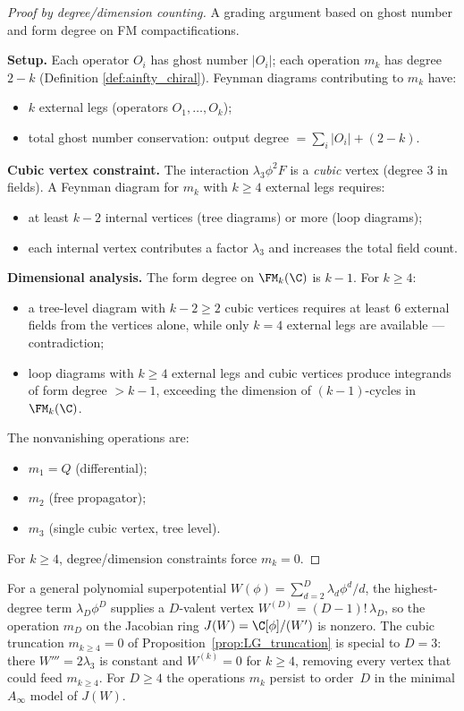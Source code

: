 \begin{proof}[Proof by degree/dimension counting]
A grading argument based on ghost number and form degree on FM compactifications.

\textbf{Setup.} Each operator $O_i$ has ghost number $|O_i|$; each operation $m_k$ has degree $2-k$ (Definition \ref{def:ainfty_chiral}). Feynman diagrams contributing to $m_k$ have:
\begin{itemize}
\item $k$ external legs (operators $O_1,\ldots,O_k$);
\item total ghost number conservation: output degree $= \sum_i |O_i| + (2-k)$.
\end{itemize}

\textbf{Cubic vertex constraint.} The interaction $\lambda_3 \phi^2 F$ is a \emph{cubic} vertex (degree 3 in fields). A Feynman diagram for $m_k$ with $k \geq 4$ external legs requires:
\begin{itemize}
\item at least $k-2$ internal vertices (tree diagrams) or more (loop diagrams);
\item each internal vertex contributes a factor $\lambda_3$ and increases the total field count.
\end{itemize}

\textbf{Dimensional analysis.} The form degree on $\FM_k(\C)$ is $k-1$. For $k \geq 4$:
\begin{itemize}
\item a tree-level diagram with $k-2 \geq 2$ cubic vertices requires at least 6 external fields from the vertices alone, while only $k = 4$ external legs are available — contradiction;
\item loop diagrams with $k \geq 4$ external legs and cubic vertices produce integrands of form degree $> k-1$, exceeding the dimension of $(k-1)$-cycles in $\FM_k(\C)$.
\end{itemize}

The nonvanishing operations are:
\begin{itemize}
\item $m_1 = Q$ (differential);
\item $m_2$ (free propagator);
\item $m_3$ (single cubic vertex, tree level).
\end{itemize}
For $k \geq 4$, degree/dimension constraints force $m_k = 0$.
\end{proof}

\begin{remark}
For a general polynomial superpotential $W(\phi) = \sum_{d=2}^D \lambda_d \phi^d/d$, the highest-degree term $\lambda_D\phi^D$ supplies a $D$-valent vertex $W^{(D)} = (D-1)!\,\lambda_D$, so the operation $m_D$ on the Jacobian ring $J(W) = \C[\phi]/(W')$ is nonzero. The cubic truncation $m_{k\ge 4} = 0$ of Proposition~\ref{prop:LG_truncation} is special to $D = 3$: there $W''' = 2\lambda_3$ is constant and $W^{(k)} = 0$ for $k \ge 4$, removing every vertex that could feed $m_{k \ge 4}$. For $D \ge 4$ the operations $m_k$ persist to order~$D$ in the minimal $A_\infty$ model of $J(W)$.
\end{remark}

